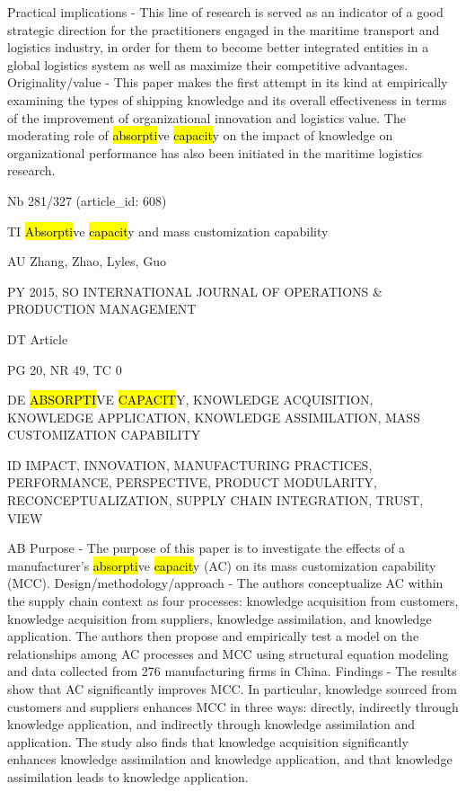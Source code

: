 \documentclass[a4paper]{article}
\begin{document}
Practical implications - This line of research is served as an indicator of a good strategic direction for the practitioners engaged in the maritime transport and logistics industry, in order for them to become better integrated entities in a global logistics system as well as maximize their competitive advantages.
Originality/value - This paper makes the first attempt in its kind at empirically examining the types of shipping knowledge and its overall effectiveness in terms of the improvement of organizational innovation and logistics value. The moderating role of \hl{absorpti}ve \hl{capacit}y on the impact of knowledge on organizational performance has also been initiated in the maritime logistics research.\par
\clearpage

\vspace*{-2cm}
Nb \tabto{0cm}281/327 (article\_id: 608)\par
TI \tabto{0cm}\hl{Absorpti}ve \hl{capacit}y and mass customization capability\par
AU \tabto{0cm}Zhang, Zhao, Lyles, Guo\par
PY \tabto{0cm}2015, SO INTERNATIONAL JOURNAL OF OPERATIONS \& PRODUCTION MANAGEMENT\par
DT \tabto{0cm}Article\par
PG \tabto{0cm}20, NR 49, TC 0\par
DE \tabto{0cm}\hl{ABSORPTI}VE \hl{CAPACIT}Y, KNOWLEDGE ACQUISITION, KNOWLEDGE APPLICATION, KNOWLEDGE ASSIMILATION, MASS CUSTOMIZATION CAPABILITY\par
ID \tabto{0cm}IMPACT, INNOVATION, MANUFACTURING PRACTICES, PERFORMANCE, PERSPECTIVE, PRODUCT MODULARITY, RECONCEPTUALIZATION, SUPPLY CHAIN INTEGRATION, TRUST, VIEW\par
AB \tabto{0cm}Purpose - The purpose of this paper is to investigate the effects of a manufacturer's \hl{absorpti}ve \hl{capacit}y (AC) on its mass customization capability (MCC).
Design/methodology/approach - The authors conceptualize AC within the supply chain context as four processes: knowledge acquisition from customers, knowledge acquisition from suppliers, knowledge assimilation, and knowledge application. The authors then propose and empirically test a model on the relationships among AC processes and MCC using structural equation modeling and data collected from 276 manufacturing firms in China.
Findings - The results show that AC significantly improves MCC. In particular, knowledge sourced from customers and suppliers enhances MCC in three ways: directly, indirectly through knowledge application, and indirectly through knowledge assimilation and application. The study also finds that knowledge acquisition significantly enhances knowledge assimilation and knowledge application, and that knowledge assimilation leads to knowledge application.
\end{document}
